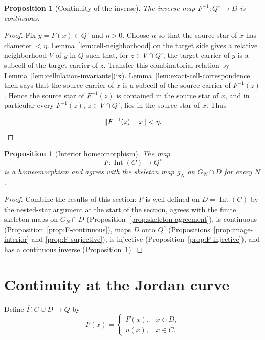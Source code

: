 \documentclass[11pt]{article}
\theoremstyle{mainplain}
\newtheorem{proposition}[theorem]{Proposition}
\theoremstyle{mainroman}
\theoremstyle{definition}
\numberwithin{equation}{section}
\begin{document}
\begin{proposition}[Continuity of the inverse]\label{prop:inverse-continuous}
The inverse map \(F^{-1}:Q^\circ\to D\) is continuous.
\end{proposition}
\begin{proof}
Fix \(y=F(x)\in Q^\circ\) and \(\eta>0\). Choose \(n\) so that the source star of \(x\) has diameter \(<\eta\). Lemma~\ref{lem:cell-neighborhood} on the target side gives a relative neighborhood \(V\) of \(y\) in \(Q\) such that, for \(z\in V\cap Q^\circ\), the target carrier of \(y\) is a subcell of the target carrier of \(z\). Transfer this combinatorial relation by Lemma~\ref{lem:cellulation-invariants}\textup{(ix)}. Lemma~\ref{lem:exact-cell-correspondence} then says that the source carrier of \(x\) is a subcell of the source carrier of \(F^{-1}(z)\). Hence the source star of \(F^{-1}(z)\) is contained in the source star of \(x\), and in particular every \(F^{-1}(z)\), \(z\in V\cap Q^\circ\), lies in the source star of \(x\). Thus

\[
\|F^{-1}(z)-x\|<\eta. \qedhere
\]
\end{proof}

\begin{proposition}[Interior homeomorphism]\label{prop:interior-homeomorphism}
The map
\[
F:\operatorname{Int}(C)\longrightarrow Q^\circ
\]
is a homeomorphism and agrees with the skeleton map \(g_N\) on
\(G_N\cap D\) for every \(N\).
\end{proposition}
\begin{proof}
Combine the results of this section: \(F\) is well defined on
\(D=\operatorname{Int}(C)\) by the nested-star argument at the start
of the section, agrees with the finite skeleton maps on \(G_N\cap D\)
(Proposition~\ref{prop:skeleton-agreement}), is continuous
(Proposition~\ref{prop:F-continuous}), maps \(D\) onto \(Q^\circ\)
(Propositions~\ref{prop:image-interior} and \ref{prop:F-surjective}),
is injective (Proposition~\ref{prop:F-injective}), and has a
continuous inverse (Proposition~\ref{prop:inverse-continuous}).
\end{proof}

\section{Continuity at the Jordan curve}\label{continuity-at-the-jordan-curve}

Define $\overline F:C\cup D\longrightarrow Q$ by
\[
\overline F(x)=
\begin{cases}
F(x),&x\in D,\\
u(x),&x\in C.
\end{cases}
\]
\end{document}
